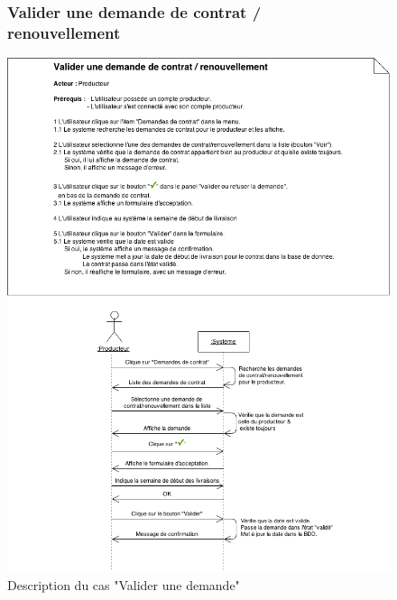\documentclass[12pt]{report}
\begin{document}
\begin{figure}[!h]
\centering
\subsubsection{Valider une demande de contrat / renouvellement~~~~~~~~~~~~~~~~~~~~~~~~~~~}
\includegraphics[width=1.\textwidth]{./ressources/desc_UC_valider_demande.png}
\caption{Description du cas "Valider une demande"}
\end{figure}
\clearpage
\end{document}
